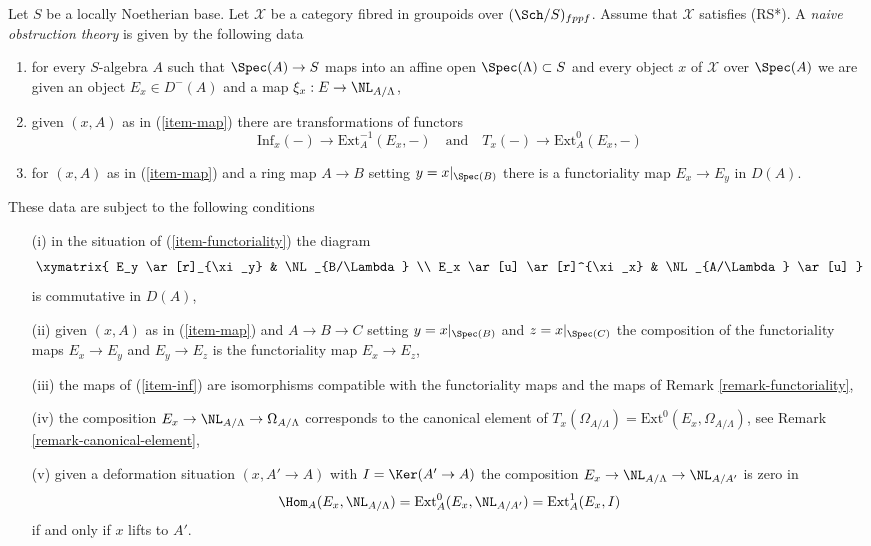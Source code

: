 \begin{definition}
\label{definition-naive-obstruction-theory}
Let $S$ be a locally Noetherian base. Let $\mathcal{X}$ be a category fibred
in groupoids over $(\Sch/S)_{fppf}$. Assume that $\mathcal{X}$
satisfies (RS*). A {\it naive obstruction theory} is 
given by the following data
\begin{enumerate}
\item
\label{item-map}
for every $S$-algebra $A$ such that $\Spec(A) \to S$
maps into an affine open $\Spec(\Lambda) \subset S$ and every object $x$
of $\mathcal{X}$ over $\Spec(A)$ we are given an object $E_x \in D^-(A)$
and a map $\xi_x : E \to \NL_{A/\Lambda}$,
\item
\label{item-inf}
given $(x, A)$ as in (\ref{item-map}) there are transformations of
functors
$$
\text{Inf}_x( - ) \to \text{Ext}^{-1}_A(E_x, -)
\quad\text{and}\quad
T_x(-) \to \text{Ext}^0_A(E_x, -)
$$
\item
\label{item-functoriality}
for $(x, A)$ as in (\ref{item-map}) and a ring map $A \to B$
setting $y = x|_{\Spec(B)}$ there is a functoriality map
$E_x \to E_y$ in $D(A)$.
\end{enumerate}
These data are subject to the following conditions
\begin{enumerate}
\item[(i)]
in the situation of (\ref{item-functoriality}) the diagram
$$
\xymatrix{
E_y \ar[r]_{\xi_y} & \NL_{B/\Lambda} \\
E_x \ar[u] \ar[r]^{\xi_x} & \NL_{A/\Lambda} \ar[u]
}
$$
is commutative in $D(A)$,
\item[(ii)]
given $(x, A)$ as in (\ref{item-map}) and $A \to B \to C$
setting $y = x|_{\Spec(B)}$ and $z = x|_{\Spec(C)}$ the
composition of the functoriality maps $E_x \to E_y$ and $E_y \to E_z$ is
the functoriality map $E_x \to E_z$,
\item[(iii)]
the maps of (\ref{item-inf}) are isomorphisms
compatible with the functoriality
maps and the maps of Remark \ref{remark-functoriality},
\item[(iv)]
the composition $E_x \to \NL_{A/\Lambda} \to \Omega_{A/\Lambda}$
corresponds to the canonical element of
$T_x(\Omega_{A/\Lambda}) = \text{Ext}^0(E_x, \Omega_{A/\Lambda})$, see
Remark \ref{remark-canonical-element},
\item[(v)]
given a deformation situation $(x, A' \to A)$ with $I = \Ker(A' \to A)$
the composition $E_x \to \NL_{A/\Lambda} \to \NL_{A/A'}$ is zero in
$$
\Hom_A(E_x, \NL_{A/\Lambda}) = \text{Ext}^0_A(E_x, \NL_{A/A'}) =
\text{Ext}^1_A(E_x, I)
$$
if and only if $x$ lifts to $A'$.
\end{enumerate}
\end{definition}

